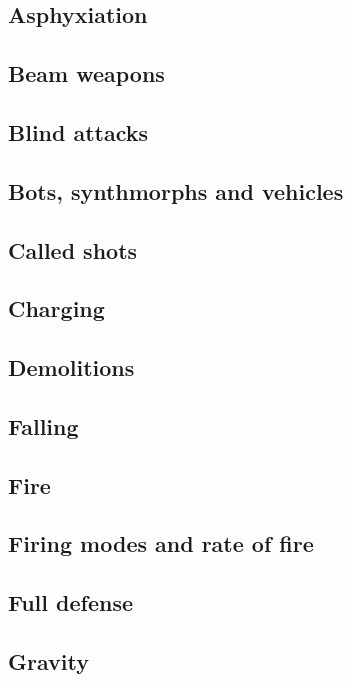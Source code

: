 \subsection{Asphyxiation}

\subsection{Beam weapons}

\subsection{Blind attacks}

\subsection{Bots, synthmorphs and vehicles}

\subsection{Called shots}

\subsection{Charging}

\subsection{Demolitions}

\subsection{Falling}

\subsection{Fire}

\subsection{Firing modes and rate of fire}

\subsection{Full defense}

\subsection{Gravity}

